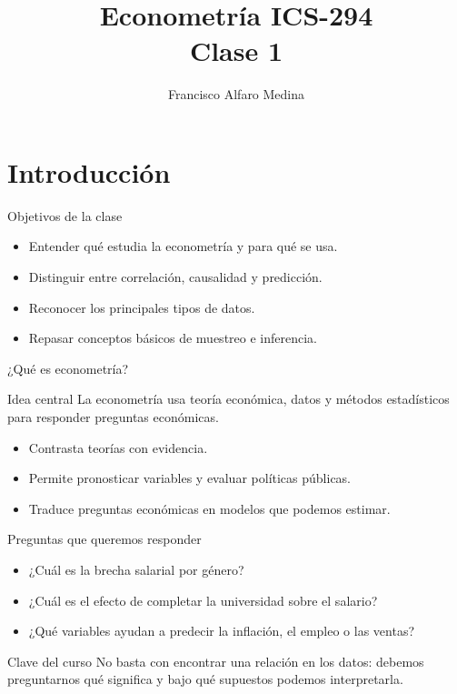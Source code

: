 \documentclass{beamer}
\title[ICS-294]{Econometría ICS-294\\ \small{Clase 1}}
\author{Francisco Alfaro Medina}
\institute[USM]
{Universidad Técnica Federico Santa María\\ %
	\medskip
	\textit{} %
	
}
\date{}
\begin{document}
	
\begin{frame}
	\titlepage %

\end{frame}
\section{Introducción}

\begin{frame}{Objetivos de la clase}
\begin{itemize}
    \item Entender qué estudia la econometría y para qué se usa.
    \item Distinguir entre correlación, causalidad y predicción.
    \item Reconocer los principales tipos de datos.
    \item Repasar conceptos básicos de muestreo e inferencia.
\end{itemize}
\end{frame}

\begin{frame}{¿Qué es econometría?}
\begin{block}{Idea central}
La econometría usa teoría económica, datos y métodos estadísticos para responder preguntas económicas.
\end{block}

\begin{itemize}
    \item Contrasta teorías con evidencia.
    \item Permite pronosticar variables y evaluar políticas públicas.
    \item Traduce preguntas económicas en modelos que podemos estimar.
\end{itemize}
 
\end{frame}

\begin{frame}{Preguntas que queremos responder}
\begin{itemize}
    \item ¿Cuál es la brecha salarial por género?
    \item ¿Cuál es el efecto de completar la universidad sobre el salario?
    \item ¿Qué variables ayudan a predecir la inflación, el empleo o las ventas?
\end{itemize}

\begin{block}{Clave del curso}
No basta con encontrar una relación en los datos: debemos preguntarnos qué significa y bajo qué supuestos podemos interpretarla.
\end{block}
\end{frame}
\end{document}
